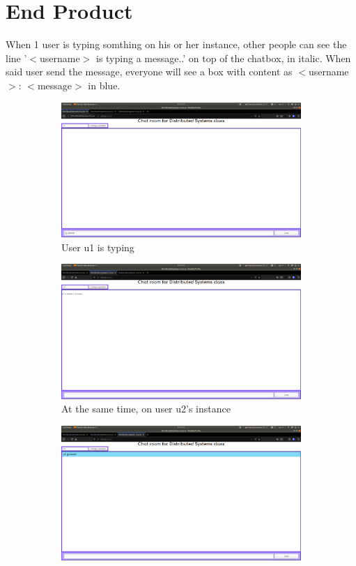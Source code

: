 \documentclass[11pt,a4paper]{report}
\begin{document}
	\section{End Product}
	When 1 user is typing somthing on his or her instance, other people can see the line '$<$username$>$ is typing a message..' on top of the chatbox, in italic. When said user send the message, everyone will see a box with content as $<$username$>$: $<$message$>$ in blue.
	\begin{figure}[h!]
		\centering
  		\begin{subfigure}[b]{0.4\linewidth}
  		\includegraphics[width=\linewidth]{u1-type-notsend.png}
    		\caption{User u1 is typing}
  		\end{subfigure}
  		\begin{subfigure}[b]{0.4\linewidth}
    		\includegraphics[width=\linewidth]{u2-notsend.png}
    		\caption{At the same time, on user u2's instance}
  		\end{subfigure}
  		\begin{subfigure}[b]{0.4\linewidth}
    		\includegraphics[width=\linewidth]{u3-aftersend.png}

\end{subfigure}
\end{figure}
\end{document}
